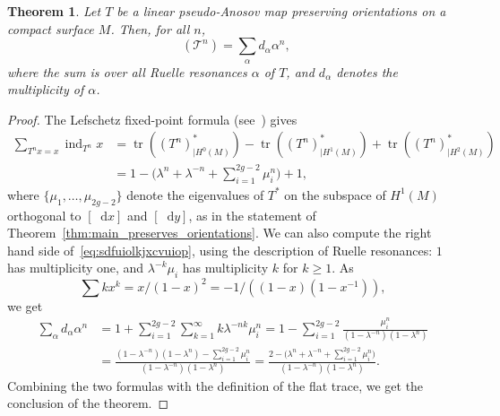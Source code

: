 \documentclass[JEP,XML,SOM,Unicode]{cedram}
\newcommand{\boT}{\mathcal{T}}
\newcommand{\dd}{\mathop{}\!\mathrm{d}}
\newcommand{\pareg}[1]{\bigl(#1\bigr)}
\newcommand{\paregg}[1]{\biggl(#1\biggr)}
\newcommand{\restr}{|}
\DeclareMathOperator{\ind}{ind}
\DeclareMathOperator{\flattr}{\mathrm{tr}^{\flat}}
\DeclareMathOperator{\tr}{tr}
\newtheorem{thm}{Theorem}[section]
\theoremstyle{definition}
\numberwithin{equation}{section}
\begin{document}
\begin{thm}
\label{thm:trace_formula} Let $T$ be a linear pseudo-Anosov map preserving
orientations on a compact surface $M$. Then, for all $n$,
\begin{equation}
\label{eq:sdfuiolkjxcvuiop}
\flattr(\boT^n) = \sum_\alpha d_\alpha \alpha^n,
\end{equation}
where the sum is over all Ruelle resonances $\alpha$ of $T$, and $d_\alpha$
denotes the multiplicity of $\alpha$.
\end{thm}
\begin{proof}
The Lefschetz fixed-point formula (see~\cite[Th.\,8.6.2]{katok}) gives
\begin{align*}
\sum_{T^n x = x} \ind_{T^n} x
&= \tr((T^n)_{\restr H^0(M)}^*) - \tr((T^n)_{\restr H^1(M)}^*) + \tr((T^n)_{\restr H^2(M)}^*)
\\[-5pt]
& = 1 - \paregg{\lambda^n + \lambda^{-n} + \sum_{i=1}^{2g-2} \mu_i^n} + 1,
\end{align*}
where $\{\mu_1,\dotsc, \mu_{2g-2}\}$ denote the eigenvalues of $T^*$ on the
subspace of $H^1(M)$ orthogonal to $[\dd x]$ and $[\dd y]$, as in the
statement of Theorem~\ref{thm:main_preserves_orientations}. We can also
compute the right hand side of~\eqref{eq:sdfuiolkjxcvuiop}, using the
description of Ruelle resonances: $1$ has multiplicity one, and
$\lambda^{-k}\mu_i$ has multiplicity $k$ for $k\geq 1$. As
\[
\sum k x^k =
x/(1-x)^2 = -1/((1-x)(1-x^{-1})),
\]
we get
\begin{align*}
\sum_\alpha d_\alpha \alpha^n
&= 1 + \sum_{i=1}^{2g-2} \sum_{k=1}^\infty k \lambda^{-nk} \mu_i^n
= 1 - \sum_{i=1}^{2g-2} \frac{\mu_i^n}{(1-\lambda^{-n})(1-\lambda^n)}
\\&
= \frac{(1-\lambda^{-n})(1-\lambda^n) - \sum_{i=1}^{2g-2}\mu_i^n}{(1-\lambda^{-n})(1-\lambda^n)}
= \frac{2 - \pareg{\lambda^n + \lambda^{-n} +\sum_{i=1}^{2g-2}\mu_i^n}}{(1-\lambda^{-n})(1-\lambda^n)}.
\end{align*}
Combining the two formulas with the definition of the flat trace, we get the
conclusion of the theorem.
\end{proof}
\end{document}
